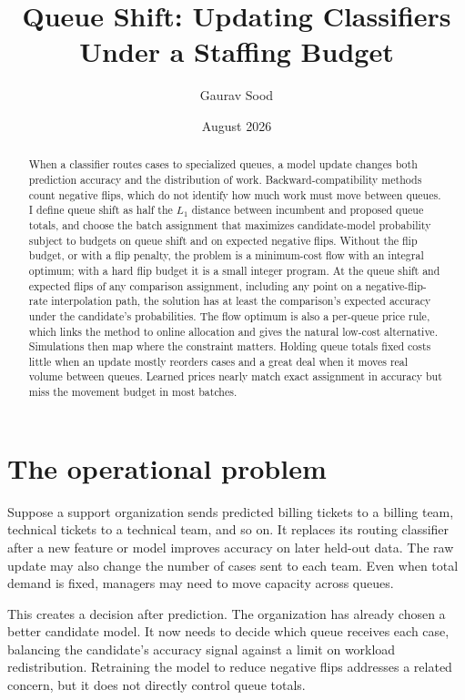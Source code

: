 \documentclass[11pt]{article}
\title{Queue Shift: Updating Classifiers Under a Staffing Budget}
\author{Gaurav Sood}
\date{August 2026}
\begin{document}
\maketitle

\begin{abstract}
When a classifier routes cases to specialized queues, a model update changes both prediction
accuracy and the distribution of work. Backward-compatibility methods count negative flips, which
do not identify how much work must move between queues. I define queue shift as half the $L_1$
distance between incumbent and proposed queue totals, and choose the batch assignment that
maximizes candidate-model probability subject to budgets on queue shift and on expected negative
flips. Without the flip budget, or with a flip penalty, the problem is a minimum-cost flow with an
integral optimum; with a hard flip budget it is a small integer program. At the queue shift and
expected flips of any comparison assignment, including any point on a negative-flip-rate
interpolation path, the solution has at least the comparison's expected accuracy under the
candidate's probabilities. The flow optimum is also a per-queue price rule, which links the method
to online allocation and gives the natural low-cost alternative. Simulations then map where the
constraint matters. Holding queue totals fixed costs little when an update mostly reorders cases
and a great deal when it moves real volume between queues. Learned prices nearly match exact
assignment in accuracy but miss the movement budget in most batches.
\end{abstract}

\section{The operational problem}

Suppose a support organization sends predicted billing tickets to a billing team, technical
tickets to a technical team, and so on. It replaces its routing classifier after a new feature or
model improves accuracy on later held-out data. The raw update may also change the number of cases
sent to each team. Even when total demand is fixed, managers may need to move capacity across
queues.

This creates a decision after prediction. The organization has already chosen a better candidate
model. It now needs to decide which queue receives each case, balancing the candidate's accuracy
signal against a limit on workload redistribution. Retraining the model to reduce negative flips
addresses a related concern, but it does not directly control queue totals.
\end{document}
